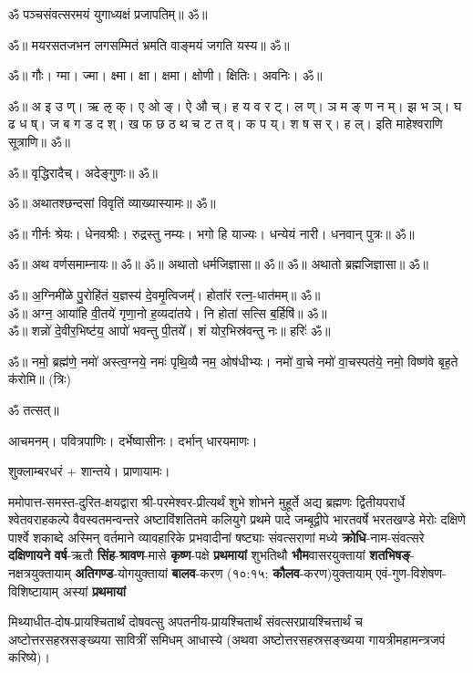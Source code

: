 ॐ पञ्चसंवत्सरमयं युगाध्यक्षं प्रजापतिम्॥ ॐ॥

ॐ॥ मयरसतजभन लगसम्मितं भ्रमति वाङ्मयं जगति यस्य॥ ॐ॥

ॐ॥ गौः। ग्मा। ज्मा। क्ष्मा। क्षा। क्षमा। क्षोणी। क्षितिः। अवनिः। ॐ॥

ॐ॥ अ इ उ ण्। ऋ ऌ क्। ए ओ ङ्। ऐ औ च्। ह य व र ट्। ल ण्। ञ म ङ् ण न म्।
झ भ ञ्। घ ढ ध ष्। ज ब ग ड द श्। ख फ छ ठ थ च ट त व्।
क प य्। श ष स र्। ह ल्। इति माहेश्वराणि सूत्राणि॥ ॐ॥

ॐ॥ वृद्धिरादैच्। अदेङ्गुणः॥ ॐ॥

ॐ॥ अथातश्छन्दसां विवृतिं व्याख्यास्यामः॥ ॐ॥ 

ॐ॥ गीर्नः श्रेयः। धेनवश्रीः। रुद्रस्तु नम्यः। भगो हि याज्यः।
धन्येयं नारी। धनवान् पुत्रः॥ ॐ॥

ॐ॥ अथ वर्णसमाम्नायः॥ ॐ॥
ॐ॥ अथातो धर्मजिज्ञासा॥ ॐ॥
ॐ॥ अथातो ब्रह्मजिज्ञासा॥ ॐ॥

ॐ॥ अ॒ग्निमी᳚ळे पु॒रोहि॑तं य॒ज्ञस्य॑ दे॒वमृ॒त्विजम्᳚। होता᳚रं रत्न॒-धात॑मम्॥ ॐ॥\\
ॐ॥ अग्न॒ आया॑हि वी॒तये॑ गृणा॒नो ह॒व्यदा॑तये। नि होता॑ सत्सि ब॒र्हिषि॑॥ ॐ॥\\
ॐ॥ शन्नो॑ दे॒वीर॒भिष्ट॑य॒ आपो॑ भवन्तु पी॒तये᳚। शं योर॒भिस्र॑वन्तु नः॥ हरिः॑ ॐ॥

ॐ॥ नमो॒ ब्रह्म॑णे॒ नमो॑ अस्त्व॒ग्नये॒ नमः॑ पृथि॒व्यै नम॒ ओष॑धीभ्यः।
नमो॑ वा॒चे नमो॑ वा॒चस्पत॑ये॒ नमो॒ विष्ण॑वे बृह॒ते क॑रोमि॥ (त्रिः)

ॐ तत्सत्॥


आचमनम्। पवित्रपाणिः। दर्भेष्वासीनः। दर्भान् धारयमाणः।

शुक्लाम्बरधरं + शान्तये। प्राणायामः।

ममोपात्त-समस्त-दुरित-क्षयद्वारा श्री-परमेश्वर-प्रीत्यर्थं शुभे शोभने मुहूर्ते अद्य ब्रह्मणः
द्वितीयपरार्धे श्वेतवराहकल्पे वैवस्वतमन्वन्तरे अष्टाविंशतितमे कलियुगे प्रथमे पादे
जम्बूद्वीपे भारतवर्षे भरतखण्डे मेरोः दक्षिणे पार्श्वे शकाब्दे अस्मिन् वर्तमाने व्यावहारिके
प्रभवादीनां षष्ट्याः संवत्सराणां मध्ये 
\textbf{क्रोधि}-नाम-संवत्सरे    \textbf{दक्षिणायने} \textbf{वर्ष}-ऋतौ   \textbf{सिंह}-\textbf{श्रावण}-मासे  \textbf{कृष्ण}-पक्षे    \textbf{प्रथमायां} शुभतिथौ  \textbf{भौम}\-वासर\-युक्तायां   \textbf{शतभिषङ्}-नक्षत्र\-युक्तायाम्    \textbf{अतिगण्ड}-योग\-युक्तायां \textbf{बालव}-करण (१०:१५; \textbf{कौलव}-करण)\-युक्तायाम्    एवं-गुण-विशेषण-विशिष्टायाम्     अस्यां \textbf{प्रथमायां}

मिथ्याधीत-दोष-प्रायश्चितार्थं दोषवत्सु अपतनीय-प्रायश्चितार्थं संवत्सर\-प्रायश्चित्तार्थं च
अष्टोत्तरसहस्रसङ्ख्यया सावित्रीं समिधम् आधास्ये (अथवा अष्टोत्तर\-सहस्र\-सङ्ख्यया गायत्री\-महा\-मन्त्र\-जपं करिष्ये)। %

